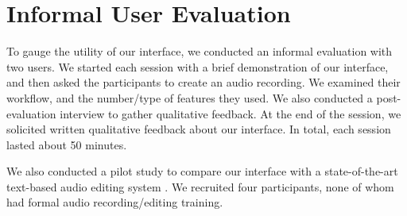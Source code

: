 \section{Informal User Evaluation}
To gauge the utility of our interface, we conducted an informal evaluation with two users. We started each session with a brief demonstration of our interface, and then asked the participants to create an audio recording. We examined their workflow, and the number/type of features they used. We also conducted a post-evaluation interview to gather qualitative feedback. At the end of the session, we solicited written qualitative feedback about our interface. In total, each session lasted about 50 minutes.


We also conducted a pilot study to compare our interface with a state-of-the-art text-based audio editing system \cite{rubin2013content}. We recruited four participants, none of whom had formal audio recording/editing training.   
 

